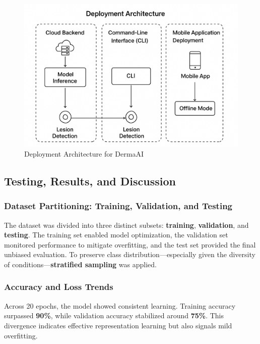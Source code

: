 \documentclass[
  12pt,
  oneside]{article}
\begin{document}
\begin{figure}

{\centering \includegraphics[width=0.7\linewidth]{deployement-architecture} 

}

\caption{Deployment Architecture for DermaAI}\label{fig:unnamed-chunk-17}
\end{figure}

\subsection{Testing, Results, and
Discussion}\label{testing-results-and-discussion}

\subsubsection{Dataset Partitioning: Training, Validation, and
Testing}\label{dataset-partitioning-training-validation-and-testing}

The dataset was divided into three distinct subsets: \textbf{training},
\textbf{validation}, and \textbf{testing}. The training set enabled
model optimization, the validation set monitored performance to mitigate
overfitting, and the test set provided the final unbiased evaluation. To
preserve class distribution---especially given the diversity of
conditions---\textbf{stratified sampling} was applied.

\subsubsection{Accuracy and Loss Trends}\label{accuracy-and-loss-trends}

Across 20 epochs, the model showed consistent learning. Training
accuracy surpassed \textbf{90\%}, while validation accuracy stabilized
around \textbf{75\%}. This divergence indicates effective representation
learning but also signals mild overfitting.
\end{document}
